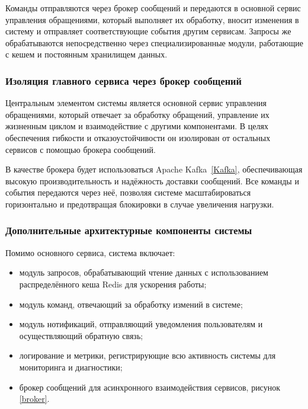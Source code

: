 Команды отправляются через брокер сообщений и передаются в основной сервис управления обращениями, который выполняет их обработку, вносит изменения в систему и отправляет соответствующие события другим сервисам. Запросы же обрабатываются непосредственно через специализированные модули, работающие с кешем и постоянным хранилищем данных.

\subsubsection{Изоляция главного сервиса через брокер сообщений}

Центральным элементом системы является основной сервис управления обращениями, который отвечает за обработку обращений, управление их жизненным циклом и взаимодействие с другими компонентами. В целях обеспечения гибкости и отказоустойчивости он изолирован от остальных сервисов с помощью брокера сообщений.

В качестве брокера будет использоваться Apache Kafka~\ref{Kafka}, обеспечивающая высокую производительность и надёжность доставки сообщений. Все команды и события передаются через неё, позволяя системе масштабироваться горизонтально и предотвращая блокировки в случае увеличения нагрузки.

\subsubsection{Дополнительные архитектурные компоненты системы}

Помимо основного сервиса, система включает:

\begin{itemize}
    \item модуль запросов, обрабатывающий чтение данных с использованием распределённого кеша Redis \cite{Redis} для ускорения работы;
    \item модуль команд, отвечающий за обработку измений в системе;
    \item модуль нотификаций, отправляющий уведомления пользователям и осуществляющий обратную связь;
    \item логирование и метрики, регистрирующие всю активность системы для мониторинга и диагностики;
    \item брокер сообщений для асинхронного взаимодействия сервисов, рисунок \ref{broker}.
\end{itemize}


